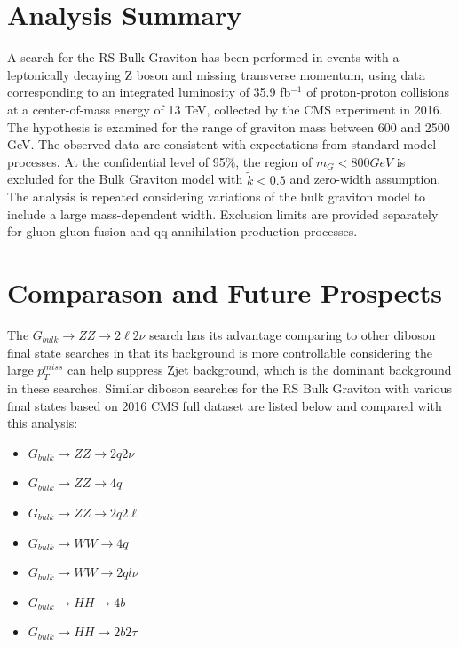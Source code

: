 \section{Analysis Summary}
A search for the RS Bulk Graviton has been performed in events with a leptonically decaying Z boson and missing transverse momentum, using data corresponding to an integrated luminosity of 35.9 fb$^{-1}$ of proton-proton collisions at a center-of-mass energy of 13 TeV, collected by the CMS experiment in 2016. The hypothesis is examined for the range of graviton mass between 600 and 2500 GeV. The observed data are consistent with expectations from standard model processes. At the confidential level of 95\%, the region of $m_G <800 GeV$ is excluded for the Bulk Graviton model with $\tilde{k}<0.5$ and zero-width assumption. The analysis is repeated considering variations of the bulk graviton model to include a large mass-dependent width. Exclusion limits are provided separately for gluon-gluon fusion and qq annihilation production processes.

\section{Comparason and Future Prospects}
The $G_{bulk}\rightarrow ZZ\rightarrow 2\ell 2\nu$ search has its advantage comparing to other diboson final state searches in that its background is more controllable considering the large $p_T ^{miss}$ can help suppress Zjet background, which is the dominant background in these searches. Similar diboson searches for the RS Bulk Graviton with various final states based on 2016 CMS full dataset are listed below and compared with this analysis:
\begin{itemize}
\item $G_{bulk}\rightarrow ZZ\rightarrow 2q 2\nu$~\cite{sum_zzqqnn}
\item $G_{bulk}\rightarrow ZZ\rightarrow 4q$~\cite{sum_vv4q}
\item $G_{bulk}\rightarrow ZZ\rightarrow 2q 2\ell$~\cite{sum_zzqqll}
\item $G_{bulk}\rightarrow WW\rightarrow 4q$~\cite{sum_vv4q}
\item $G_{bulk}\rightarrow WW\rightarrow 2ql\nu$~\cite{sum_wwqqln}
\item $G_{bulk}\rightarrow HH\rightarrow 4b$~\cite{sum_hh4b}
\item $G_{bulk}\rightarrow HH\rightarrow 2b 2\tau$~\cite{sum_hh2b2t}
\end{itemize}

